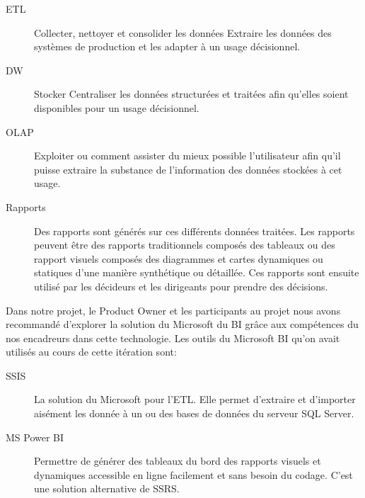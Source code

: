 \begin{description}
    \item [\acrfull{ETL}] Collecter, nettoyer et consolider les données
        Extraire les données des systèmes de production et les adapter à un
        usage décisionnel.
    \item [\acrfull{DW}] Stocker Centraliser les données structurées et
        traitées afin qu'elles soient disponibles pour un usage décisionnel.
    \item [\acrfull{OLAP}] Exploiter ou comment assister du mieux possible
        l'utilisateur afin qu'il puisse extraire la substance de l'information
        des données stockées à cet usage.
    \item [Rapports] Des rapports sont générés sur ces différents données
        traitées. Les rapports peuvent être des rapports traditionnels composés
        des tableaux ou des rapport visuels composés des diagrammes et cartes
        dynamiques ou statiques d’une manière synthétique ou détaillée. Ces
        rapports sont ensuite utilisé par les décideurs et les dirigeants pour
        prendre des décisions.
\end{description}

Dans notre projet, le Product Owner et les participants au projet nous avons
recommandé d'explorer la solution du Microsoft du BI grâce aux compétences du
nos encadreurs dans cette technologie. Les outils du Microsoft BI qu'on avait
utilisés au cours de cette itération sont:

\begin{description}
    \item [\acrfull{SSIS}] La solution du Microsoft pour l'\acrshort{ETL}. Elle
        permet d'extraire et d'importer aisément les donnée à un ou des bases
        de données du serveur SQL Server.
    \item [MS Power BI] Permettre de générer des tableaux du bord des rapports
        visuels et dynamiques accessible en ligne facilement et sans besoin du
        codage. C'est une solution alternative de \acrfull{SSRS}.
\end{description}


